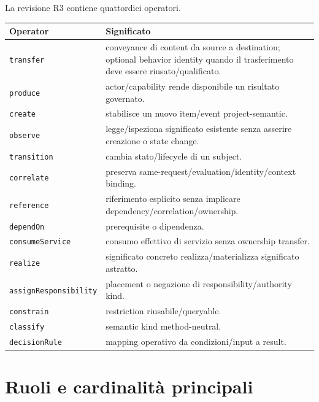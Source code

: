 \documentclass[11pt,a4paper]{article}
\newcommand{\code}[1]{\nolinkurl{#1}}
\begin{document}
La revisione R3 contiene quattordici operatori.

\begin{longtable}{L{0.22\textwidth}L{0.66\textwidth}}
\toprule
\textbf{Operator} & \textbf{Significato} \\
\midrule\endhead
\code{transfer} & conveyance di content da source a destination; optional behavior identity quando il trasferimento deve essere riusato/qualificato. \\
\code{produce} & actor/capability rende disponibile un risultato governato. \\
\code{create} & stabilisce un nuovo item/event project-semantic. \\
\code{observe} & legge/ispeziona significato esistente senza asserire creazione o state change. \\
\code{transition} & cambia stato/lifecycle di un subject. \\
\code{correlate} & preserva same-request/evaluation/identity/context binding. \\
\code{reference} & riferimento esplicito senza implicare dependency/correlation/ownership. \\
\code{dependOn} & prerequisite o dipendenza. \\
\code{consumeService} & consumo effettivo di servizio senza ownership transfer. \\
\code{realize} & significato concreto realizza/materializza significato astratto. \\
\code{assignResponsibility} & placement o negazione di responsibility/authority kind. \\
\code{constrain} & restriction riusabile/queryable. \\
\code{classify} & semantic kind method-neutral. \\
\code{decisionRule} & mapping operativo da condizioni/input a result. \\
\bottomrule
\end{longtable}

\section{Ruoli e cardinalità principali}
\end{document}
